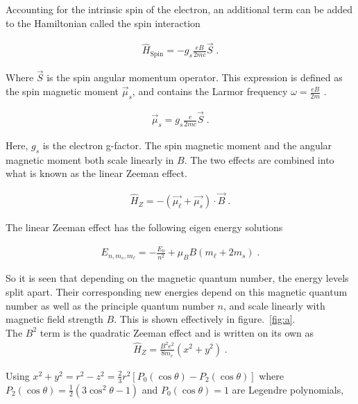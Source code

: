         \noindent Accounting for the intrinsic spin of the electron, an additional term can be added to the Hamiltonian called the spin interaction \cite{Sakurai_Napolitano_2020}

        \begin{align}
            \hat{H}_{\text{Spin}} = -g_s \frac{eB}{2mc} \vec{S}\;.
        \end{align}

        \noindent Where $\vec{S}$ is the spin angular momentum operator. This expression is defined as the spin magnetic moment $\vec{\mu}_s$, and contains the Larmor frequency $\omega = \frac{eB}{2m}$ \cite{Foot_2005}.

        \begin{align}
            \vec{\mu}_s = g_s \frac{e}{2mc} \vec{S}\;.
        \end{align}

        \noindent Here, $g_s$ is the electron g-factor. The spin magnetic moment and the angular magnetic moment both scale linearly in $B$. The two effects are combined into what is known as the linear Zeeman effect.

        \begin{align}
            \hat{H}_Z = - \left(\vec{\mu_\ell} + \vec{\mu_s} \right) \cdot \vec{B}\;.
        \end{align}

        \noindent The linear Zeeman effect has the following eigen energy solutions 

        \begin{align}
            E_{n, m_s, m_\ell} = - \frac{E_0}{n^2} + \mu_B B(m_\ell + 2m_s)\;.
        \end{align}

        \noindent So it is seen that depending on the magnetic quantum number, the energy levels split apart. Their corresponding new energies depend on this magnetic quantum number as well as the principle quantum number $n$, and scale linearly with magnetic field strength $B$. This is shown effectively in figure.~\ref{fig:a}.\\

        \noindent The $B^2$ term is the quadratic Zeeman effect and is written on its own as
        \begin{align}
            \hat{H}_Z = \frac{B^2e^2}{8m_e} (x^2 + y^2)\;.
        \end{align}

        \noindent Using $x^2 + y^2 = r^2 - z^2 = \frac{2}{3}r^2\left[ P_0(\cos \theta) - P_2(\cos \theta)\right]$ where $P_2(\cos \theta) = \frac{1}{2}\left(3\cos^2\theta - 1\right)$ and $P_0(\cos \theta) = 1$ are Legendre polynomials,

